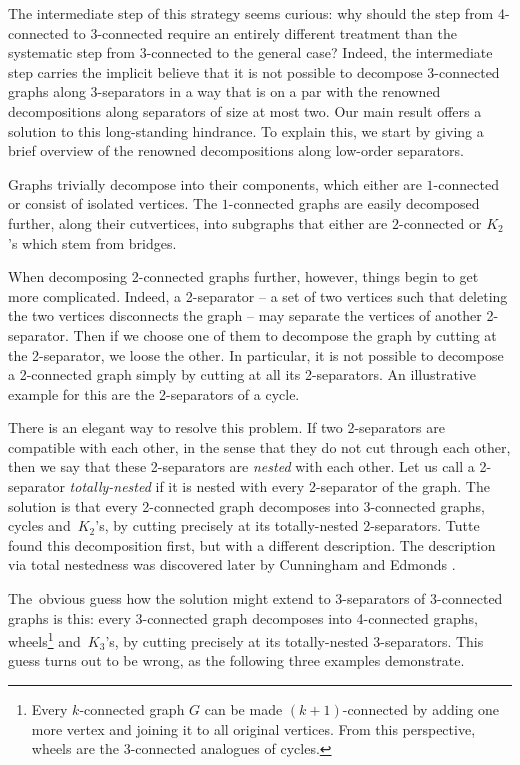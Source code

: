 \documentclass{aic}
\theoremstyle{plain}
\theoremstyle{definition}
\theoremstyle{plain}
\theoremstyle{plain}
\begin{document}
The intermediate step of this strategy seems curious: why should the step from 4-connected to 3-connected require an entirely different treatment than the systematic step from 3-connected to the general case?
Indeed, the intermediate step carries the implicit believe that it is not possible to decompose 3-connected graphs along 3-separators in a way that is on a par with the renowned decompositions along separators of size at most two.
Our main result offers a solution to this long-standing hindrance.
To explain this, we start by giving a brief overview of the renowned decompositions along low-order separators.



Graphs trivially decompose into their components, which either are $1$-connected or consist of isolated vertices.
The $1$-connected graphs are easily decomposed further, along their cutvertices, into subgraphs that either are $2$-connected or $K_2$'s which stem from bridges.

When decomposing 2-connected graphs further, however, things begin to get more complicated.
Indeed, a 2-separator -- a set of two vertices such that deleting the two vertices disconnects the graph --  may separate the vertices of another 2-separator.
Then if we choose one of them to decompose the graph by cutting at the 2-separator, we loose the other.
In particular, it is not possible to decompose a 2-connected graph simply by cutting at all its 2-separators.
An illustrative example for this are the 2-separators of a cycle.

There is an elegant way to resolve this problem.
If two 2-separators are compatible with each other, in the sense that they do not cut through each other, then we say that these 2-separators are \emph{nested} with each other.
Let us call a 2-separator \emph{totally-nested} if it is nested with every 2-separator of the graph.
The solution is that every 2-connected graph decomposes into 3-connected graphs, cycles and~$K_2$'s, by cutting precisely at its totally-nested 2-separators. 
Tutte~\cite{TutteGrTh} found this decomposition first, but with a different description. 
The description via total nestedness was discovered later by Cunningham and Edmonds \cite{cunningham_edmonds_1980}.

The~obvious guess how the solution might extend to 3-separators of 3-connected graphs is this: every 3-connected graph decomposes into 4-connected graphs, wheels\footnote{Every $k$-connected graph $G$ can be made $(k+1)$-connected by adding one more vertex and joining it to all original vertices. From this perspective, wheels are the 3-connected analogues of cycles.} and~$K_3$'s, by cutting precisely at its totally-nested 3-separators.
This guess turns out to be wrong, as the following three examples demonstrate.\medskip
\end{document}
